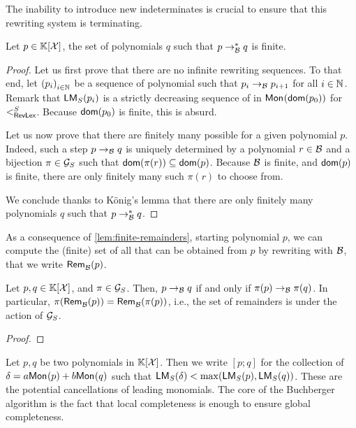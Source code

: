 The inability to introduce new indeterminates is crucial
to ensure that this rewriting system is terminating.
\begin{lemma}
    \label{lem:finite-remainders}
    Let $p \in \poly{\K}{\X}$,
    the set of polynomials $q$ such that $p \reduc{\Basis} q$
    is finite.
\end{lemma}
\begin{proof}
    Let us first prove that there are no infinite rewriting sequences.
    To that end, let $\seqof{p_i}[i \in \N]$ be a sequence of 
    polynomial such that $p_i \reducstep{\Basis} p_{i+1}$
    for all $i \in \N$.
    Remark that $\lm[S](p_i)$ is a strictly decreasing 
    sequence of  in $\mon{\dom(p_0)}$
    for $\revlex[S]$. Because $\dom(p_0)$ is finite,
    this is absurd.

    Let us now prove that there are finitely many 
    possible  for a given polynomial $p$.
    Indeed, such a step $p \reducstep{\Basis} q$ is
    uniquely determined by a polynomial $r \in \Basis$
    and a bijection $\pi \in \group_S$ such that
    $\dom(\pi(r)) \subseteq \dom(p)$. Because $\Basis$ is finite,
    and $\dom(p)$ is finite, there are only finitely many such $\pi(r)$
    to choose from.

    We conclude thanks to König's lemma that there are only finitely
    many polynomials $q$ such that $p \reduc{\Basis} q$.
\end{proof}

\AP As a consequence of \cref{lem:finite-remainders}, starting polynomial $p$,
we can compute the (finite) set of all  that can be obtained
from $p$ by rewriting with $\Basis$, that we write $\rem{\Basis}{p}$. 

\begin{lemma}
    \label{lem:rewrite-equivariant}
    Let $p,q \in \poly{\K}{\X}$, and $\pi \in \group_S$.
    Then,
    $p \reducstep{\Basis} q$ if and only if
    $\pi(p) \reducstep{\Basis} \pi(q)$.
    In particular, $\pi(\rem{\Basis}{p}) = \rem{\Basis}{\pi(p)}$,
    i.e., the set of remainders is 
    under the action of $\group_S$.
\end{lemma}
\begin{proof}
\end{proof}


\AP Let $p,q$ be two polynomials in $\poly{\K}{\X}$. Then we write $[p;q]$ for
the collection of  $\delta = a \mon p + b \mon q$ such that
$\lm[S](\delta) < \max(\lm[S](p), \lm[S](q))$. These are the potential
cancellations of leading monomials.
The core of the Buchberger algorithm is the fact that
local completeness is enough to ensure global completeness.

